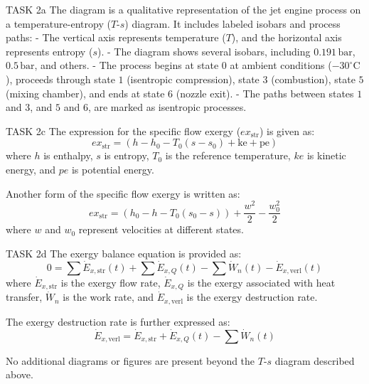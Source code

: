 TASK 2a  
The diagram is a qualitative representation of the jet engine process on a temperature-entropy (\(T\)-\(s\)) diagram. It includes labeled isobars and process paths:  
- The vertical axis represents temperature (\(T\)), and the horizontal axis represents entropy (\(s\)).  
- The diagram shows several isobars, including \(0.191 \, \text{bar}\), \(0.5 \, \text{bar}\), and others.  
- The process begins at state \(0\) at ambient conditions (\(-30^\circ\text{C}\)), proceeds through state \(1\) (isentropic compression), state \(3\) (combustion), state \(5\) (mixing chamber), and ends at state \(6\) (nozzle exit).  
- The paths between states \(1\) and \(3\), and \(5\) and \(6\), are marked as isentropic processes.  

TASK 2c  
The expression for the specific flow exergy (\(ex_{\text{str}}\)) is given as:  
\[
ex_{\text{str}} = (h - h_0 - T_0(s - s_0) + \text{ke} + \text{pe})
\]  
where \(h\) is enthalpy, \(s\) is entropy, \(T_0\) is the reference temperature, \(ke\) is kinetic energy, and \(pe\) is potential energy.  

Another form of the specific flow exergy is written as:  
\[
ex_{\text{str}} = (h_0 - h - T_0(s_0 - s)) + \frac{w^2}{2} - \frac{w_0^2}{2}
\]  
where \(w\) and \(w_0\) represent velocities at different states.  

TASK 2d  
The exergy balance equation is provided as:  
\[
0 = \sum \dot{E}_{x,\text{str}}(t) + \sum \dot{E}_{x,Q}(t) - \sum \dot{W}_n(t) - \dot{E}_{x,\text{verl}}(t)
\]  
where \(\dot{E}_{x,\text{str}}\) is the exergy flow rate, \(\dot{E}_{x,Q}\) is the exergy associated with heat transfer, \(\dot{W}_n\) is the work rate, and \(\dot{E}_{x,\text{verl}}\) is the exergy destruction rate.  

The exergy destruction rate is further expressed as:  
\[
\dot{E}_{x,\text{verl}} = \dot{E}_{x,\text{str}} + \dot{E}_{x,Q}(t) - \sum \dot{W}_n(t)
\]  

No additional diagrams or figures are present beyond the \(T\)-\(s\) diagram described above.